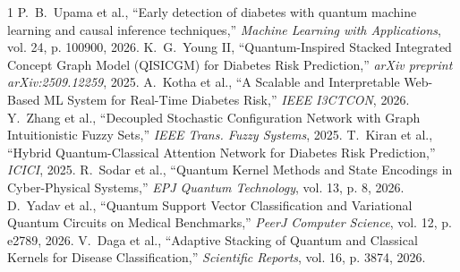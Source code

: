 \documentclass[10pt,journal,compsoc]{IEEEtran}
\begin{document}

\begin{thebibliography}{1}
 P.~B.~Upama et al., ``Early detection of diabetes with quantum machine learning and causal inference techniques,'' \emph{Machine Learning with Applications}, vol. 24, p. 100900, 2026.
 K.~G.~Young II, ``Quantum-Inspired Stacked Integrated Concept Graph Model (QISICGM) for Diabetes Risk Prediction,'' \emph{arXiv preprint arXiv:2509.12259}, 2025.
 A.~Kotha et al., ``A Scalable and Interpretable Web-Based ML System for Real-Time Diabetes Risk,'' \emph{IEEE I3CTCON}, 2026.
 Y.~Zhang et al., ``Decoupled Stochastic Configuration Network with Graph Intuitionistic Fuzzy Sets,'' \emph{IEEE Trans. Fuzzy Systems}, 2025.
 T.~Kiran et al., ``Hybrid Quantum-Classical Attention Network for Diabetes Risk Prediction,'' \emph{ICICI}, 2025.
 R.~Sodar et al., ``Quantum Kernel Methods and State Encodings in Cyber-Physical Systems,'' \emph{EPJ Quantum Technology}, vol. 13, p. 8, 2026.
 D.~Yadav et al., ``Quantum Support Vector Classification and Variational Quantum Circuits on Medical Benchmarks,'' \emph{PeerJ Computer Science}, vol. 12, p. e2789, 2026.
 V.~Daga et al., ``Adaptive Stacking of Quantum and Classical Kernels for Disease Classification,'' \emph{Scientific Reports}, vol. 16, p. 3874, 2026.
\end{thebibliography}
\end{document}
